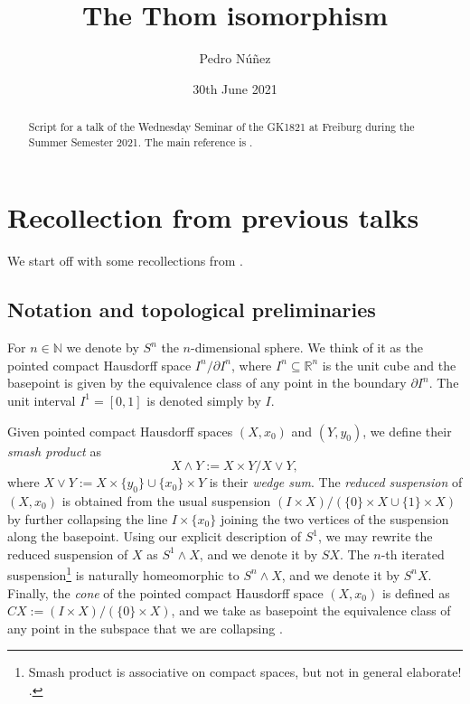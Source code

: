 \documentclass[12pt,a4paper]{amsart}
\title[The Thom isomorphism]{The Thom isomorphism}
\author[Pedro N\'{u}\~{n}ez]{Pedro N\'{u}\~{n}ez}
\date{30th June 2021}
\theoremstyle{plain}
\theoremstyle{definition}
\theoremstyle{remark}
\begin{document}
\maketitle

\begin{abstract}
  Script for a talk of the Wednesday Seminar of the GK1821 at Freiburg during the Summer Semester 2021.
  The main reference is \cite[\S 2]{ati67}.
\end{abstract}

\tableofcontents

\section{Recollection from previous talks}

We start off with some recollections from \cite[\S 2]{ati67}.

\subsection{Notation and topological preliminaries}

For $n \in \mathbb{N}$ we denote by $S^{n}$ the $n$-dimensional sphere.
We think of it as the pointed compact Hausdorff space $I^{n}/\partial I^{n}$, where $I^{n} \subseteq \mathbb{R}^{n}$ is the unit cube and the basepoint is given by the equivalence class of any point in the boundary $\partial I^{n}$.
The unit interval $I^{1} = [0,1]$ is denoted simply by $I$.

Given pointed compact Hausdorff spaces $(X,x_{0})$ and $(Y,y_{0})$, we define their \textit{smash product} as
\[ X \wedge Y := X \times Y / X \vee Y, \]
where $X \vee Y := X \times \{y_{0}\} \cup \{ x_{0}\} \times Y$ is their \textit{wedge sum}.
The \textit{reduced suspension} of $(X,x_{0})$ is obtained from the usual suspension $(I\times X)/(\{0\}\times X \cup \{1\} \times X)$ by further collapsing the line $I \times \{ x_{0} \}$ joining the two vertices of the suspension along the basepoint.
Using our explicit description of $S^{1}$, we may rewrite the reduced suspension of $X$ as $S^{1} \wedge X$, and we denote it by $SX$.
The $n$-th iterated suspension\footnote{Smash product is associative on compact spaces, but not in general \color{red} elaborate! \color{black}.} is naturally homeomorphic to $S^{n} \wedge X$, and we denote it by $S^{n}X$. %
Finally, the \textit{cone} of the pointed compact Hausdorff space $(X,x_{0})$ is defined as $CX := (I \times X )/ (\{0 \} \times X)$, and we take as basepoint the equivalence class of any point in the subspace that we are collapsing \cite[p.~68]{ati67}.
\end{document}
